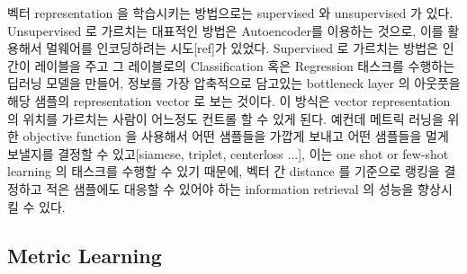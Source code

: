 벡터 representation 을 학습시키는 방법으로는 supervised 와 unsupervised 가 있다. Unsupervised 로 가르치는 대표적인 방법은 Autoencoder를 이용하는 것으로, 이를 활용해서 멀웨어를 인코딩하려는 시도[ref]가 있었다. Supervised 로 가르치는 방법은 인간이 레이블을 주고 그 레이블로의 Classification 혹은 Regression 태스크를 수행하는 딥러닝 모델을 만들어, 정보를 가장 압축적으로 담고있는 bottleneck layer 의 아웃풋을 해당 샘플의 representation vector 로 보는 것이다. 이 방식은 vector representation 의 위치를 가르치는 사람이 어느정도 컨트롤 할 수 있게 된다. 예컨데 메트릭 러닝을 위한 objective function 을 사용해서 어떤 샘플들을 가깝게 보내고 어떤 샘플들을 멀게 보낼지를 결정할 수 있고[siamese, triplet, centerloss ...], 이는 one shot or few-shot learning 의 태스크를 수행할 수 있기 때문에, 벡터 간 distance 를 기준으로 랭킹을 결정하고 적은 샘플에도 대응할 수 있어야 하는 information retrieval 의 성능을 향상시킬 수 있다. 


\subsection{Metric Learning}



